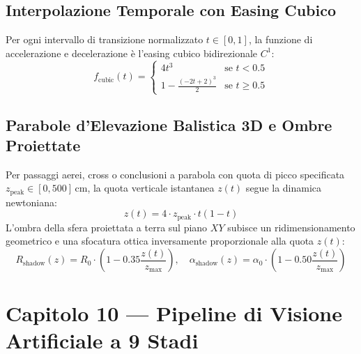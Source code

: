 \documentclass[11pt,a4paper]{article}
\begin{document}
\subsection{Interpolazione Temporale con Easing Cubico}
Per ogni intervallo di transizione normalizzato $t \in [0, 1]$, la funzione di accelerazione e decelerazione è l'easing cubico bidirezionale $C^1$:
\begin{equation}
f_{\text{cubic}}(t) = \begin{cases}
4 t^3 & \text{se } t < 0.5 \\[0.5em]
1 - \frac{(-2t + 2)^3}{2} & \text{se } t \ge 0.5
\end{cases}
\end{equation}

\subsection{Parabole d'Elevazione Balistica 3D e Ombre Proiettate}
Per passaggi aerei, cross o conclusioni a parabola con quota di picco specificata $z_{\text{peak}} \in [0, 500]\,\text{cm}$, la quota verticale istantanea $z(t)$ segue la dinamica newtoniana:
\begin{equation}
z(t) = 4 \cdot z_{\text{peak}} \cdot t(1 - t)
\end{equation}
L'ombra della sfera proiettata a terra sul piano $XY$ subisce un ridimensionamento geometrico e una sfocatura ottica inversamente proporzionale alla quota $z(t)$:
\begin{equation}
R_{\text{shadow}}(z) = R_0 \cdot \left( 1 - 0.35 \frac{z(t)}{z_{\max}} \right), \quad \alpha_{\text{shadow}}(z) = \alpha_0 \cdot \left( 1 - 0.50 \frac{z(t)}{z_{\max}} \right)
\end{equation}


\section{Capitolo 10 — Pipeline di Visione Artificiale a 9 Stadi}
\end{document}
